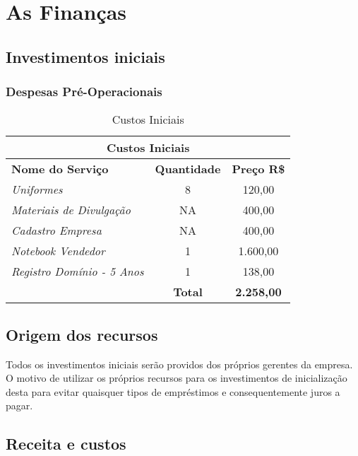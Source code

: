 \chapter{As Finanças}
\label{cap:financas}
	
	\section{Investimentos iniciais}
	
        \subsection{Despesas Pré-Operacionais}
	\begin{table}[htbp]
		\centering
		\caption{Custos Iniciais}
		
			\begin{tabularx}{\linewidth}{|X|c|c|}
				\toprule
				\multicolumn{3}{c}{\cellcolor{gray!50}\textbf{Custos Iniciais}} \\
				\midrule
				\textbf{Nome do Serviço} & \textbf{Quantidade} & \textbf{Preço R\$} \\
				\midrule
				\textit{Uniformes}					&	8	& 120,00 \\
				\textit{Materiais de Divulgação}	&	NA	& 400,00 \\
				\textit{Cadastro Empresa}			&	NA	& 400,00 \\
				\textit{Notebook Vendedor}			&	1	& 1.600,00 \\
				\textit{Registro Domínio - 5 Anos}	&	1	& 138,00 \\
                \midrule
				~ & \textbf{Total} & \textbf{2.258,00} \\
				\bottomrule
			\end{tabularx}
		
		\label{tab:previas}%
	\end{table}%
	
    
	\section{Origem dos recursos}
		Todos os investimentos iniciais serão providos dos próprios gerentes da empresa. O motivo de utilizar os próprios recursos para os investimentos de inicialização desta para evitar quaisquer tipos de empréstimos e consequentemente juros a pagar.
	
    
    
    
	\section{Receita e custos}
		
